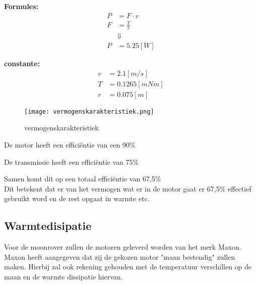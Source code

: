 \begin{multicols}{2}
        \textbf{Formules:}
        \begin{equation}
            \begin{split}
                P &= F \cdot v \\
                F &= \frac{T}{r} \\
                &\Downarrow \\
                P &= 5.25 [W]
            \end{split}
        \end{equation}

        \textbf{constante:}
        \begin{equation*}
            \begin{split}
                v &= 2.1 [m/s] \\
                T &= 0.1265[mNm]  \\
                r &= 0.075[m]
            \end{split}
        \end{equation*}
    \end{multicols}

    \begin{figure}[H]
        \centering
        \texttt{[image: vermogenskarakteristiek.png]}
        \caption{vermogenskarakteristiek}
        \label{fig:vermogenskarakteristiek}
        \end{figure}

De motor heeft een efficiëntie van een 90\%

De transmissie heeft een efficiëntie van 75\%

Samen komt dit op een totaal efficiëntie van 67,5\% \\
Dit betekent dat er van het vermogen wat er in de motor gaat er 67,5\% effectief gebruikt word en de rest opgaat in warmte etc.

\subsection{Warmtedisipatie}

Voor de moonrover zullen de motoren geleverd worden van het merk Maxon. Maxon heeft aangegeven dat zij de gekozen motor "maan bestendig" zullen maken. Hierbij zal ook rekening gehouden met de temperatuur verschillen op de maan en de warmte dissipatie hiervan. 